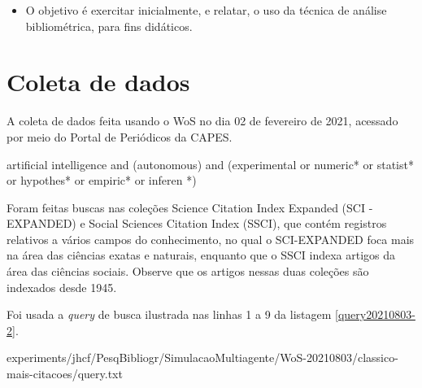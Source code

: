 \begin{itemize}
\item O objetivo é exercitar inicialmente, e relatar, o uso da técnica de análise bibliométrica, para fins didáticos.
\end{itemize}


\section{Coleta de dados}

A coleta de dados feita usando o WoS no dia 02 de fevereiro de 2021, acessado por meio do Portal de Periódicos da CAPES.

artificial intelligence and (autonomous) and (experimental  or  numeric* or  statist* or  hypothes* or  empiric* or  inferen *)

Foram feitas buscas nas coleções Science  Citation  Index  Expanded (SCI -EXPANDED) e Social  Sciences  Citation  Index (SSCI), que contém registros relativos a vários campos do conhecimento, no qual o SCI-EXPANDED foca mais na área das ciências exatas e naturais, enquanto que o SSCI indexa artigos da área das ciências sociais. Observe que os artigos nessas duas coleções são indexados desde 1945. 

Foi usada a \textit{query} de busca ilustrada nas linhas 1 a 9 da listagem \ref{query20210803-2}.


{experiments/jhcf/PesqBibliogr/SimulacaoMultiagente/WoS-20210803/classico-mais-citacoes/query.txt}